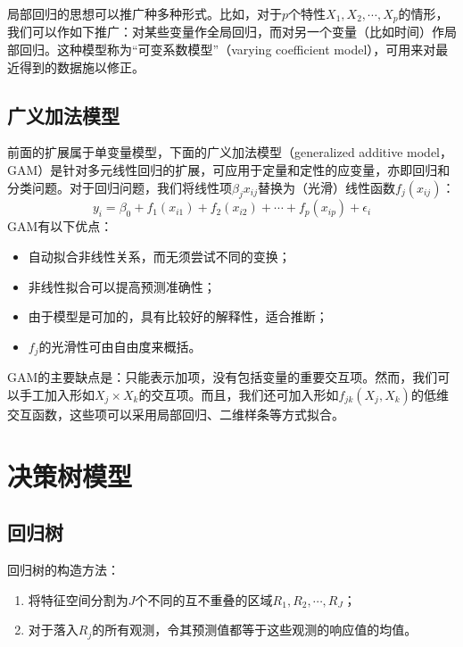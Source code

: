 \documentclass[hyperref,]{ctexart}
\providecommand{\tightlist}{%
  \setlength{\itemsep}{0pt}\setlength{\parskip}{0pt}}
\begin{document}
局部回归的思想可以推广种多种形式。比如，对于\(p\)个特性\(X_1,X_2,\cdots,X_p\)的情形，我们可以作如下推广：对某些变量作全局回归，而对另一个变量（比如时间）作局部回归。这种模型称为``可变系数模型''（varying
coefficient model），可用来对最近得到的数据施以修正。

\subsection{广义加法模型}

前面的扩展属于单变量模型，下面的广义加法模型（generalized additive
model，GAM）是针对多元线性回归的扩展，可应用于定量和定性的应变量，亦即回归和分类问题。对于回归问题，我们将线性项\(\beta_jx_{ij}\)替换为（光滑）线性函数\(f_j(x_{ij})\)：
\[y_i = \beta_0 + f_1(x_{i1}) + f_2(x_{i2}) + \cdots + f_p(x_{ip}) + \epsilon_i\]
GAM有以下优点：

\begin{itemize}
\tightlist
\item
  自动拟合非线性关系，而无须尝试不同的变换；
\item
  非线性拟合可以提高预测准确性；
\item
  由于模型是可加的，具有比较好的解释性，适合推断；
\item
  \(f_j\)的光滑性可由自由度来概括。
\end{itemize}

GAM的主要缺点是：只能表示加项，没有包括变量的重要交互项。然而，我们可以手工加入形如\(X_j\times X_k\)的交互项。而且，我们还可加入形如\(f_{jk}(X_j,X_k)\)的低维交互函数，这些项可以采用局部回归、二维样条等方式拟合。

\section{决策树模型}

\subsection{回归树}

回归树的构造方法：

\begin{enumerate}
\def\labelenumi{\arabic{enumi}.}
\tightlist
\item
  将特征空间分割为\(J\)个不同的互不重叠的区域\(R_1,R_2,\cdots,R_J\)；
\item
  对于落入\(R_j\)的所有观测，令其预测值都等于这些观测的响应值的均值。
\end{enumerate}
\end{document}
